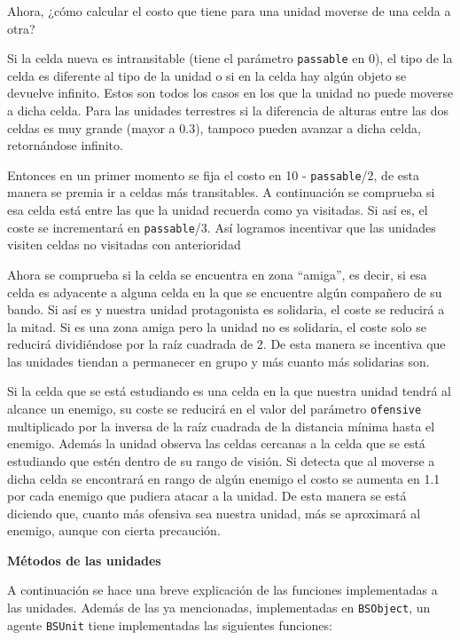 Ahora, ¿cómo calcular el costo que tiene para una unidad moverse de una celda a otra?
 
Si la celda nueva es intransitable (tiene el parámetro \verb|passable| en 0), el tipo de la celda es diferente al tipo de la unidad o si en la celda hay algún objeto se devuelve infinito. Estos son todos los casos en los que la unidad no puede moverse a dicha celda. Para las unidades terrestres si la diferencia de alturas entre las dos celdas es muy grande (mayor a 0.3), tampoco pueden avanzar a dicha celda, retornándose infinito. 
 
Entonces en un primer momento se fija el costo en 10 - \verb|passable|/2, de esta manera se premia ir a celdas más transitables. A continuación se comprueba si esa celda está entre las que la unidad recuerda como ya visitadas. Si así es, el coste se incrementará en \verb|passable|/3. Así logramos incentivar que las unidades visiten celdas no visitadas con anterioridad  
  
Ahora se comprueba si la celda se encuentra en zona ``amiga'', es decir, si esa celda es adyacente a alguna celda en la que se encuentre algún compañero de su bando. Si así es y nuestra unidad protagonista es solidaria, el coste se reducirá a la mitad. Si es una zona amiga pero la unidad no es solidaria, el coste solo se reducirá dividiéndose por la raíz cuadrada de 2. De esta manera se incentiva que las unidades tiendan a permanecer en grupo y más cuanto más solidarias son.

Si la celda que se est\'a estudiando es una celda en la que nuestra unidad tendr\'a al alcance un enemigo, su coste se reducir\'a en el valor del par\'ametro \verb|ofensive|  multiplicado por la inversa de la ra\'iz cuadrada de la distancia m\'inima hasta el enemigo. Adem\'as la unidad observa las celdas cercanas a la celda que se est\'a estudiando que est\'en dentro de su rango de visi\'on. Si detecta que al moverse a dicha celda se encontrar\'a en rango de alg\'un enemigo el costo se aumenta en 1.1 por cada enemigo que pudiera atacar a la unidad. De esta manera se est\'a diciendo que, cuanto m\'as ofensiva sea nuestra unidad, m\'as se aproximar\'a al enemigo, aunque con cierta precauci\'on.  

\textbf{M\'etodos de las unidades}

A continuaci\'on se hace una breve explicaci\'on de las funciones implementadas a las unidades. Adem\'as de las  ya mencionadas, implementadas en \verb|BSObject|, un agente \verb|BSUnit| tiene implementadas las siguientes funciones:


